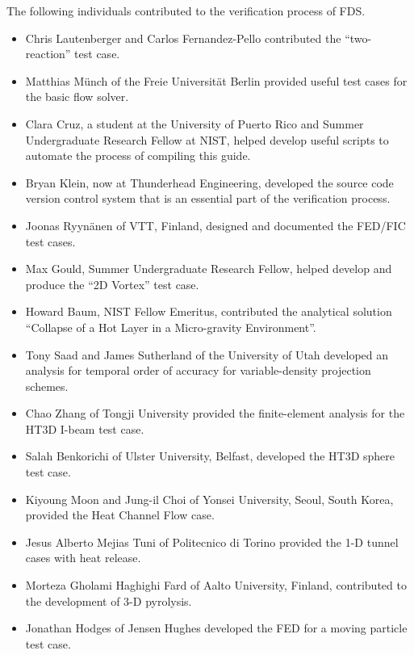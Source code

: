 \documentclass[11pt]{book}
\begin{document}
The following individuals contributed to the verification process of FDS.
\begin{itemize}
\item Chris Lautenberger and Carlos Fernandez-Pello contributed the ``two-reaction'' test case.
\item Matthias M\"{u}nch of the Freie Universit\"{a}t Berlin provided useful test cases for the basic flow solver.
\item Clara Cruz, a student at the University of Puerto Rico and Summer Undergraduate Research Fellow at NIST, helped develop useful scripts to automate the process of compiling this guide.
\item Bryan Klein, now at Thunderhead Engineering, developed the source code version control system that is an essential part of the verification process.
\item Joonas Ryyn\"{a}nen of VTT, Finland, designed and documented the FED/FIC test cases.
\item Max Gould, Summer Undergraduate Research Fellow, helped develop and produce the ``2D Vortex'' test case.
\item Howard Baum, NIST Fellow Emeritus, contributed the analytical solution ``Collapse of a Hot Layer in a Micro-gravity Environment''.
\item Tony Saad and James Sutherland of the University of Utah developed an analysis for temporal order of accuracy for variable-density projection schemes.
\item Chao Zhang of Tongji University provided the finite-element analysis for the HT3D I-beam test case.
\item Salah Benkorichi of Ulster University, Belfast, developed the HT3D sphere test case.
\item Kiyoung Moon and Jung-il Choi of Yonsei University, Seoul, South Korea, provided the Heat Channel Flow case.
\item Jesus Alberto Mejias Tuni of Politecnico di Torino provided the 1-D tunnel cases with heat release.
\item Morteza Gholami Haghighi Fard of Aalto University, Finland, contributed to the development of 3-D pyrolysis.
\item Jonathan Hodges of Jensen Hughes developed the FED for a moving particle test case.
\end{itemize}


\cleardoublepage
{}
{}
\tableofcontents

\cleardoublepage
{}
{}
\listoffigures
\end{document}

